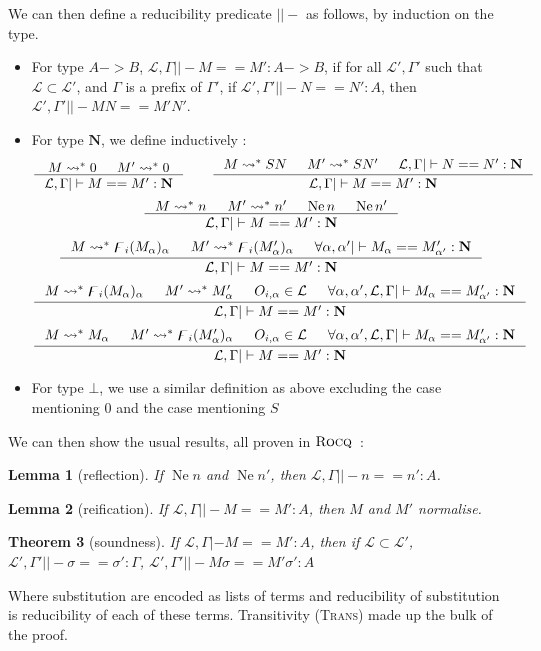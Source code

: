 \documentclass[11pt]{article}
\newtheorem{theorem}{Theorem}[section]
\newtheorem{lemma}[theorem]{Lemma}
\DeclareMathOperator{\neu}{Ne}
\newcommand{\0}{\mathbf{0}}
\newcommand{\1}{\mathbf{1}}
\newcommand{\nat}{\mathbf{N}}
\newcommand{\tctx}{\Gamma}
\newcommand{\fctx}{\mathcal{L}}
\newcommand{\rocq}{\textsc{Rocq}}
\begin{document}
We can then define a reducibility predicate $||-$ as follows, by induction on the type.
\begin{itemize}
    \item For type $A -> B$, $\fctx,\tctx ||- M == M' : A -> B$, if for all $\fctx',\tctx'$ such that $\fctx\subset\fctx'$, and $\tctx$ is a prefix of $\tctx'$, if $\fctx',\tctx' ||- N == N' : A$, then $\fctx', \tctx' ||- MN == M'N'$.
    \item For type $\nat$, we define inductively :
$$
    \inference{M \leadsto^\ast 0&M' \leadsto^\ast 0}{\fctx,\tctx ||- M == M' : \nat}\qquad
    \inference{M \leadsto^\ast SN&M' \leadsto^\ast SN' &\fctx,\tctx ||- N == N' : \nat}{\fctx,\tctx ||- M == M' : \nat}
$$
$$
    \inference{M \leadsto^\ast n&M' \leadsto^\ast n' &\neu n & \neu n'}{\fctx,\tctx ||- M == M' : \nat}
$$
$$
    \inference{M \leadsto^\ast \digamma_i (M_\alpha)_\alpha&M' \leadsto^\ast \digamma_i({M'_\alpha})_\alpha & \forall \alpha,\alpha' ||- M_\alpha == M'_{\alpha'} : \nat}{\fctx,\tctx ||- M == M' : \nat}
$$
$$
    \inference{M \leadsto^\ast \digamma_i(M_\alpha)_\alpha&M' \leadsto^\ast M'_\alpha & O_{i,\alpha}\in \fctx & \forall \alpha,\alpha', \fctx,\tctx ||- M_\alpha == M'_{\alpha'} : \nat}{\fctx,\tctx ||- M == M' : \nat}
$$
$$
    \inference{M \leadsto^\ast M_\alpha&M' \leadsto^\ast \digamma_i (M'_\alpha)_\alpha & O_{i,\alpha}\in \fctx & \forall \alpha,\alpha', \fctx,\tctx ||- M_\alpha == M'_{\alpha'} : \nat}{\fctx,\tctx ||- M == M' : \nat}
$$
    \item For type $\bot$, we use a similar definition as above excluding the case mentioning $0$ and the case mentioning $S$ 
\end{itemize}

We can then show the usual results, all proven in $\rocq$~:

\begin{lemma}[reflection]
    If $\neu n$ and $\neu n'$, then $\fctx,\tctx ||- n == n' : A$.
\end{lemma}
\begin{lemma}[reification]
    If $\fctx,\tctx ||- M == M' : A$, then $M$ and $M'$ normalise.
\end{lemma}

\begin{theorem}[soundness]
    If $\fctx,\tctx |- M == M' : A$, then if $\fctx \subset \fctx'$, $\fctx',\tctx'||-\sigma == \sigma' : \Gamma$, $\fctx',\tctx' ||- M\sigma == M'\sigma' : A$
\end{theorem}
Where substitution are encoded as lists of terms and reducibility of substitution is reducibility of each of these terms. Transitivity (\textsc{Trans}) made up the bulk of the proof.
\end{document}
